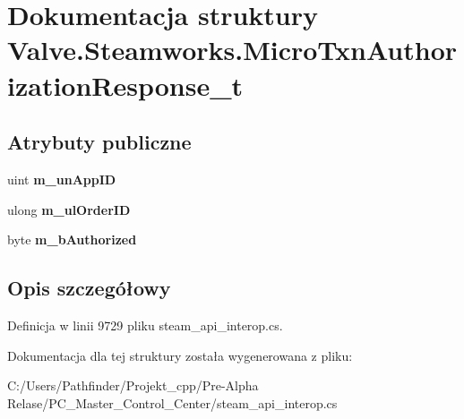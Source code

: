 \hypertarget{struct_valve_1_1_steamworks_1_1_micro_txn_authorization_response__t}{}\section{Dokumentacja struktury Valve.\+Steamworks.\+Micro\+Txn\+Authorization\+Response\+\_\+t}
\label{struct_valve_1_1_steamworks_1_1_micro_txn_authorization_response__t}
\subsection*{Atrybuty publiczne}
\begin{DoxyCompactItemize}
\item 
\mbox{\label{struct_valve_1_1_steamworks_1_1_micro_txn_authorization_response__t_a007bd23df3d4fb6b6041a4eb0f4d1962}} 
uint {\bfseries m\+\_\+un\+App\+ID}
\item 
\mbox{\label{struct_valve_1_1_steamworks_1_1_micro_txn_authorization_response__t_a719f93f7ca8c64ad20fd6c1d3c167a7c}} 
ulong {\bfseries m\+\_\+ul\+Order\+ID}
\item 
\mbox{\label{struct_valve_1_1_steamworks_1_1_micro_txn_authorization_response__t_ac3d947aec0534b8c019a326fb01a7048}} 
byte {\bfseries m\+\_\+b\+Authorized}
\end{DoxyCompactItemize}


\subsection{Opis szczegółowy}


Definicja w linii 9729 pliku steam\+\_\+api\+\_\+interop.\+cs.



Dokumentacja dla tej struktury została wygenerowana z pliku\+:\begin{DoxyCompactItemize}
\item 
C\+:/\+Users/\+Pathfinder/\+Projekt\+\_\+cpp/\+Pre-\/\+Alpha Relase/\+P\+C\+\_\+\+Master\+\_\+\+Control\+\_\+\+Center/steam\+\_\+api\+\_\+interop.\+cs\end{DoxyCompactItemize}
